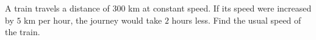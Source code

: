 A train travels a distance of $300$ km at constant speed. If its speed were increased by $5$ km per hour, the journey would take $2$ hours less. Find the usual speed of the train.
